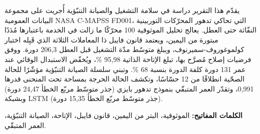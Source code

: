 \par\medskip


يقدّم هذا التقرير دراسة في سلامة التشغيل والصيانة التنبّؤية أُجريت على مجموعة البيانات العمومية NASA C-MAPSS FD001، التي تحاكي تدهور المحرّكات التوربينية النفّاثة حتى العطل. يعالج تحليل الموثوقية 100 محرّكًا ما زالت في الخدمة باعتبارها مُدَدًا مبتورة من اليمين، ويعتمد قانون فايبل ذا المعاملات الثلاثة الذي قَبِله اختبار كولموغوروف-سميرنوف، ويبلغ متوسّط مدّة التشغيل قبل العطل 206,3 دورة. ووفق فرضيات إصلاح مُصرَّح بها، تبلغ الإتاحة الذاتية 95,98 \%، ويُخفّض الاستبدال الوقائي عند عمر 131 دورة كلفة الدورة بنسبة 68 \%. وتبني سلسلة الصيانة التنبّؤية مؤشّرًا للحالة الصحّية انطلاقًا من 12 حسّاسًا، وتكشف الحالة الحرجة بمساحة تحت المنحنى قدرها 0,991، وتقدّر العمر المتبقّي بنموذج تدهور بايزي (جذر متوسّط مربّع الخطأ 24,47 دورة) وبشبكة LSTM (جذر متوسّط مربّع الخطأ 15,35 دورة).


\textbf{الكلمات المفاتيح:} الموثوقية، البتر من اليمين، قانون فايبل، الإتاحة، الصيانة التنبّؤية، العمر المتبقّي.
